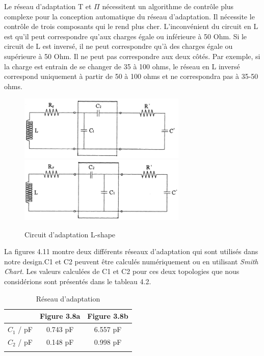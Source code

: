 \documentclass[11pt, a4paper, twoside]{book}
\begin{document}
Le réseau d'adaptation T et \(\Pi\) nécessitent un algorithme de contrôle plus complexe pour la conception automatique du réseau d'adaptation. Il nécessite le contrôle de trois composants qui le rend plus cher. L'inconvénient du circuit en L est qu'il peut correspondre qu'aux charges égale ou inférieure à 50 Ohm. Si le circuit de L est inversé, il ne peut correspondre qu'à des charges égale ou supérieure à 50 Ohm. Il ne peut pas correspondre aux deux côtés. Par exemple, si la charge est entrain de se changer de 35 à 100 ohms, le réseau en L inversé correspond uniquement à partir de 50 à 100 ohms et ne correspondra pas à 35-50 ohms.
\begin{figure}[H]
\centering
\includegraphics[width=8cm]{matcha}
\includegraphics[width=8cm]{matchb}
\caption{Circuit d'adaptation L-shape}
\end{figure}
La figures 4.11 montre deux différents réseaux d'adaptation qui sont utilisés dans notre  design.C1 et C2 peuvent être calculés numériquement ou en utilisant \emph {Smith Chart}. Les valeurs calculées de C1 et C2 pour ces deux topologies que nous considérions sont présentés dans le tableau 4.2.\\
\begin{longtable}[c]{| c | c | c |}
 \hline
  & Figure 3.8a & Figure 3.8b\\
 \hline
 \(C_{1}\) / pF & 0.743 pF & 6.557 pF\\
 \hline
 \(C_{2}\) / pF & 0.148 pF & 0.998 pF\\
 \hline
\caption{Réseau d'adaptation}
\end{longtable}
\end{document}
